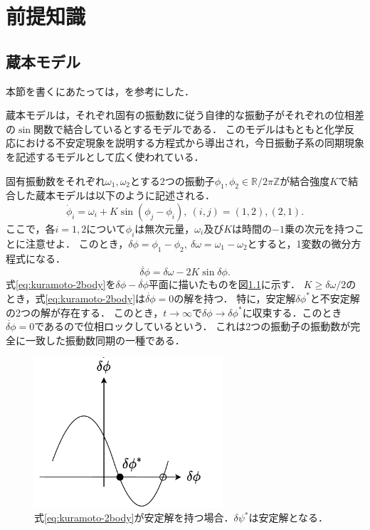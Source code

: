 \documentclass[../main]{subfiles}
\begin{document}
\chapter{前提知識}
\label{chap:prev}
\section{蔵本モデル}
\label{sec:kuramoto-model}
本節を書くにあたっては，\cite{RODRIGUES20161,biorhythm}を参考にした．

蔵本モデルは，それぞれ固有の振動数に従う自律的な振動子がそれぞれの位相差の$\sin$関数で結合しているとするモデルである．
このモデルはもともと化学反応における不安定現象を説明する方程式から導出され\cite{kuramoto1975}，今日振動子系の同期現象を記述するモデルとして広く使われている．

固有振動数をそれぞれ$\omega_1,\omega_2$とする2つの振動子$\phi_1,\phi_2\in\mathbb{R}/2\pi\mathbb{Z}$が結合強度$K$で結合した蔵本モデルは以下のように記述される．
\begin{equation}
    \label{eq:kuramoto-2}
    \dot{\phi}_i=\omega_i+K\sin(\phi_j-\phi_i),\ (i,j)=(1,2),(2,1).
\end{equation}
ここで，各$i=1,2$について$\phi_i$は無次元量，$\omega_i$及び$K$は時間の$-1$乗の次元を持つことに注意せよ．
このとき，$\delta\phi=\phi_1-\phi_2,\ \delta\omega=\omega_1-\omega_2$とすると，1変数の微分方程式になる．
\begin{equation}
    \label{eq:kuramoto-2body}
    \dot{\delta\phi}=\delta\omega-2K\sin\delta\phi.  
\end{equation}
式\eqref{eq:kuramoto-2body}を$\delta\phi-\dot{\delta\phi}$平面に描いたものを図\ref{fig:kuramoto-2}に示す．
$K\geq\delta\omega/2$のとき，式\eqref{eq:kuramoto-2body}は$\dot{\delta\phi}=0$の解を持つ．
特に，安定解$\delta\phi^\ast$と不安定解の2つの解が存在する．
このとき，$t\to\infty$で$\delta\phi\to\delta\phi^\ast$に収束する．このとき$\dot{\delta\phi}=0$であるので位相ロックしているという．
これは2つの振動子の振動数が完全に一致した振動数同期の一種である．

\begin{figure}[tbp]
\centering
\includegraphics[width=70mm]{images/kuramoto-2.pdf}
\centering
\caption{式\eqref{eq:kuramoto-2body}が安定解を持つ場合．$\delta\psi^\ast$は安定解となる．}
\label{fig:kuramoto-2}
\end{figure}
\end{document}
